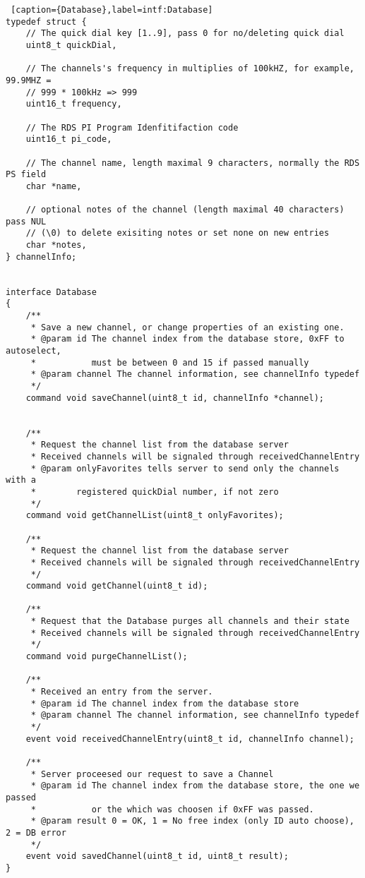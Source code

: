 \documentclass[a4paper,10pt]{article}
\begin{document}

\begin{lstlisting} [caption={Database},label=intf:Database]
typedef struct {
	// The quick dial key [1..9], pass 0 for no/deleting quick dial
    uint8_t quickDial,

    // The channels's frequency in multiplies of 100kHZ, for example, 99.9MHZ =
    // 999 * 100kHz => 999
    uint16_t frequency,

    // The RDS PI Program Idenfitifaction code
    uint16_t pi_code,

    // The channel name, length maximal 9 characters, normally the RDS PS field
    char *name,

    // optional notes of the channel (length maximal 40 characters) pass NUL
    // (\0) to delete exisiting notes or set none on new entries
    char *notes,
} channelInfo;


interface Database
{
	/**
	 * Save a new channel, or change properties of an existing one.
	 * @param id The channel index from the database store, 0xFF to autoselect,
     *           must be between 0 and 15 if passed manually
	 * @param channel The channel information, see channelInfo typedef
	 */
	command void saveChannel(uint8_t id, channelInfo *channel);


	/**
	 * Request the channel list from the database server
     * Received channels will be signaled through receivedChannelEntry
     * @param onlyFavorites tells server to send only the channels with a
     *        registered quickDial number, if not zero
	 */
	command void getChannelList(uint8_t onlyFavorites);

	/**
	 * Request the channel list from the database server
     * Received channels will be signaled through receivedChannelEntry
	 */
	command void getChannel(uint8_t id);

	/**
	 * Request that the Database purges all channels and their state
     * Received channels will be signaled through receivedChannelEntry
	 */
	command void purgeChannelList();

	/**
	 * Received an entry from the server.
	 * @param id The channel index from the database store
	 * @param channel The channel information, see channelInfo typedef
	 */
	event void receivedChannelEntry(uint8_t id, channelInfo channel);

	/**
	 * Server proceesed our request to save a Channel
     * @param id The channel index from the database store, the one we passed
     *           or the which was choosen if 0xFF was passed.
	 * @param result 0 = OK, 1 = No free index (only ID auto choose), 2 = DB error 
	 */
	event void savedChannel(uint8_t id, uint8_t result);
}
\end{lstlisting}
\end{document}
